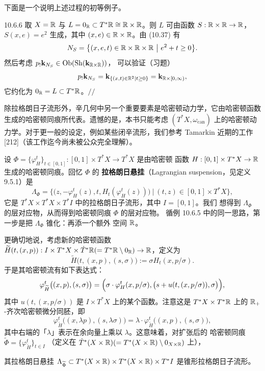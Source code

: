 下面是一个说明上述过程的初等例子。

\begin{wexam}{10.6.6}
取 $X=\mathbb{R}$ 与 $L=0_{\mathbb{R}}\subset T^*\mathbb{R}\cong\mathbb{R}\times\mathbb{R}$。则 $L$ 可由函数
$S:\mathbb{R}\times\mathbb{R}\to\mathbb{R}$，$S(x,e)=e^2$ 生成，其中 $(x,e)\in\mathbb{R}\times\mathbb{R}$。由
(10.37) 有
\[
  N_S=\bigl\{(x,e,t)\in\R\times\R\times\R\ \big|\ e^2+t\ge0\bigr\}.
\]
然后考虑 $p_!\mathbf{k}_{N_S}\in\operatorname{Ob}(\operatorname{Sh}(\mathbf{k}_{\mathbb{R}\times\mathbb{R}}))$，
可以验证（习题）
\[
  p_!\mathbf{k}_{N_S}
  =\mathbf{k}_{\{(x,t)\in\mathbb{R}^2\mid t\ge0\}}
  =\mathbf{k}_{\mathbb{R}\times[0,\infty)},
\]
它约化为 $0_{\mathbb{R}}=L\subset T^*\mathbb{R}$。\hfill$//$
\end{wexam}

除拉格朗日子流形外，辛几何中另一个重要要素是哈密顿动力学，它由哈密顿函数
生成的哈密顿同痕所代表。遗憾的是，本书只能考虑 $(T^*X,\omega_{\mathrm{can}})$
上的哈密顿动力学。对于更一般的设定，例如某些闭辛流形，我们参考 Tamarkin
近期的工作 [212]（该工作迄今尚未被公众完全理解）。

设 $\Phi=\{\varphi^t_H\}_{t\in[0,1]}:[0,1]\times T^*X\to T^*X$ 是由哈密顿
函数 $H:[0,1]\times T^*X\to\mathbb{R}$ 生成的哈密顿同痕。回忆 $\Phi$ 的
\textbf{拉格朗日悬挂}（Lagrangian suspension，见定义 9.5.1）是
\[
  \Lambda_{\Phi}
  =\bigl\{\bigl(z,-\varphi^t_H(z),t,H_t(\varphi^t_H(z))\bigr)
  \ \bigl|\ (t,z)\in[0,1]\times T^*X\bigr\},
\]
它是 $T^*X\times T^*X\times T^*I$ 中的拉格朗日子流形，其中 $I=[0,1]$。我们
想得到 $\Lambda_{\Phi}$ 的层对应物，从而得到哈密顿同痕 $\Phi$ 的层对应物。
循例 10.6.5 中的同一思路，第一步是把 $\Lambda_{\Phi}$ 锥化：再添一个额外
空间 $\mathbb{R}$。

更确切地说，考虑新的哈密顿函数
$\widetilde H(t,(x,p)):I\times T^*X\times\dot T^*\mathbb{R}
(=T^*\mathbb{R}\setminus0_{\mathbb{R}})\to\mathbb{R}$，定义为
\[
  \widetilde H\bigl(t,(x,p),(s,\sigma)\bigr)
  :=\sigma H_t(x,p/\sigma).
\]
于是其哈密顿流有如下表达式：
\[
  \varphi^t_{\widetilde H}\bigl((x,p),(s,\sigma)\bigr)
  =\Bigl(\sigma\cdot\varphi^t_H(x,p/\sigma),
  \bigl(s+u(t,(x,p/\sigma)),\sigma\bigr)\Bigr),
\]
其中 $u(t,(x,p/\sigma))$ 是 $I\times T^*X$ 上的某个函数。注意这是
$T^*X\times T^*\mathbb{R}$ 上的 $\mathbb{R}_+$-齐次哈密顿微分同胚，即
\[
  \varphi^t_{\widetilde H}\bigl((x,\lambda p),(s,\lambda\sigma)\bigr)
  =\lambda\cdot\varphi^t_{\widetilde H}\bigl((x,p),(s,\sigma)\bigr),
\]
其中右端的「$\lambda$」表示在余向量上乘以 $\lambda$。这意味着，对扩张后的
哈密顿同痕
$\widetilde\Phi=\{\varphi^t_{\widetilde H}\}_{t\in I}$
（定义在 $\dot T^*(X\times\mathbb{R})(=T^*(X\times\mathbb{R})\setminus0_{X\times\mathbb{R}})$ 上），

其拉格朗日悬挂
$\Lambda_{\widetilde\Phi}\subset T^*(X\times\mathbb{R})\times T^*(X\times\mathbb{R})
\times T^*I$ 是锥形拉格朗日子流形。

